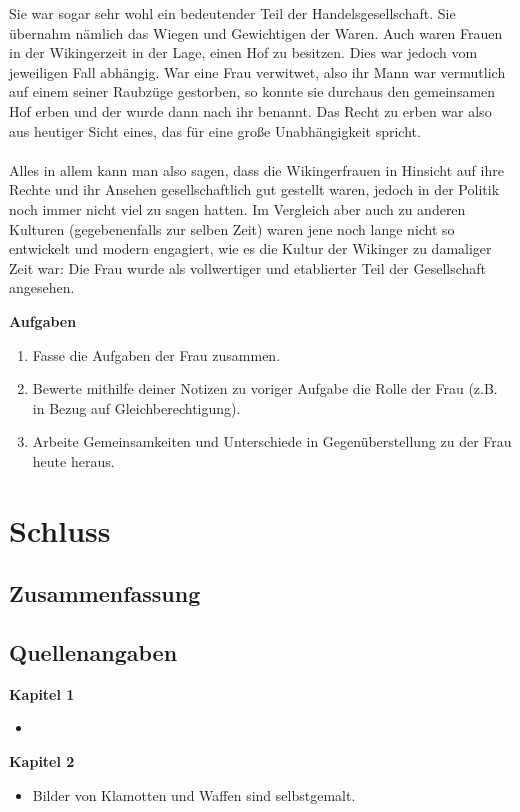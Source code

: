 \documentclass[12pt,a4paper,ngerman,openany]{book}
\newcommand{\aufgaben}[1]{
  \begin{tcolorbox}
    \textbf{Aufgaben}
    \begin{enumerate}
      #1
    \end{enumerate}
  \end{tcolorbox}
} %
\newcommand{\fchapter}[1]{\chapter{#1}\thispagestyle{chapterstyle}}
\begin{document}
Sie war sogar sehr wohl ein bedeutender Teil der Handelsgesellschaft. Sie übernahm nämlich das Wiegen und Gewichtigen der Waren. 
Auch waren Frauen in der Wikingerzeit in der Lage, einen Hof zu besitzen. Dies war jedoch vom jeweiligen Fall abhängig. War eine Frau verwitwet, also ihr Mann war vermutlich auf einem seiner Raubzüge gestorben, so konnte sie durchaus den gemeinsamen Hof erben und der wurde dann nach ihr benannt. Das Recht zu erben war also aus heutiger Sicht eines, das für eine große Unabhängigkeit spricht.\\\\
Alles in allem kann man also sagen, dass die Wikingerfrauen in Hinsicht auf ihre Rechte und ihr Ansehen gesellschaftlich gut gestellt waren, jedoch in der Politik noch immer nicht viel zu sagen hatten. Im Vergleich aber auch zu anderen Kulturen (gegebenenfalls zur selben Zeit) waren jene noch lange nicht so entwickelt und modern engagiert, wie es die Kultur der Wikinger zu damaliger Zeit war:
Die Frau wurde als vollwertiger und etablierter Teil der Gesellschaft angesehen.

\aufgaben{
  \item Fasse die Aufgaben der Frau zusammen.
  \item Bewerte mithilfe deiner Notizen zu voriger Aufgabe die Rolle der Frau (z.B. in Bezug auf Gleichberechtigung).
  \item Arbeite Gemeinsamkeiten und Unterschiede in Gegenüberstellung zu der Frau heute heraus.
}

\fchapter{Schluss}

\section{Zusammenfassung}

\newpage %
\section{Quellenangaben}


\textbf{Kapitel 1}
\begin{itemize}
  \item 
\end{itemize}

\textbf{Kapitel 2}
\begin{itemize}
  \item Bilder von Klamotten und Waffen sind selbstgemalt.
\end{itemize}
\end{document}

